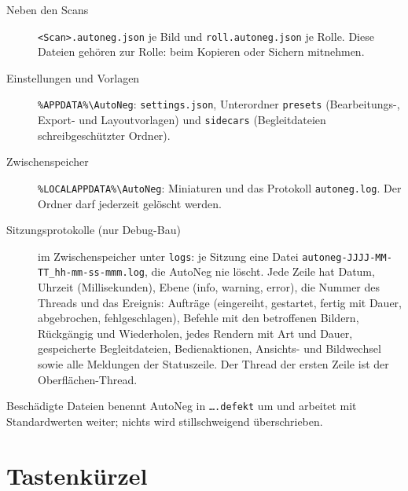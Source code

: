 \documentclass[a4paper,11pt,parskip=half,DIV=12]{scrartcl}
\newcommand{\datei}[1]{\texttt{#1}}                   %
\begin{document}
\begin{description}
  \item[Neben den Scans] \datei{<Scan>.autoneg.json} je Bild und \datei{roll.autoneg.json} je
        Rolle. Diese Dateien gehören zur Rolle: beim Kopieren oder Sichern mitnehmen.
  \item[Einstellungen und Vorlagen] \datei{\%APPDATA\%\textbackslash AutoNeg}: \datei{settings.json},
        Unterordner \datei{presets} (Bearbeitungs-, Export- und Layoutvorlagen) und
        \datei{sidecars} (Begleitdateien schreibgeschützter Ordner).
  \item[Zwischenspeicher] \datei{\%LOCALAPPDATA\%\textbackslash AutoNeg}: Miniaturen und das
        Protokoll \datei{autoneg.log}. Der Ordner darf jederzeit gelöscht werden.
  \item[Sitzungsprotokolle (nur Debug-Bau)] im Zwischenspeicher unter \datei{logs}: je Sitzung
        eine Datei \datei{autoneg-JJJJ-MM-TT\_hh-mm-ss-mmm.log}, die AutoNeg nie löscht. Jede
        Zeile hat Datum, Uhrzeit (Millisekunden), Ebene (info, warning, error), die Nummer des
        Threads und das Ereignis: Aufträge (eingereiht, gestartet, fertig mit Dauer,
        abgebrochen, fehlgeschlagen), Befehle mit den betroffenen Bildern, Rückgängig und
        Wiederholen, jedes Rendern mit Art und Dauer, gespeicherte Begleitdateien,
        Bedienaktionen, Ansichts- und Bildwechsel sowie alle Meldungen der Statuszeile. Der
        Thread der ersten Zeile ist der Oberflächen-Thread.
\end{description}
Beschädigte Dateien benennt AutoNeg in \datei{….defekt} um und arbeitet mit Standardwerten
weiter; nichts wird stillschweigend überschrieben.

\section{Tastenkürzel}
\end{document}
